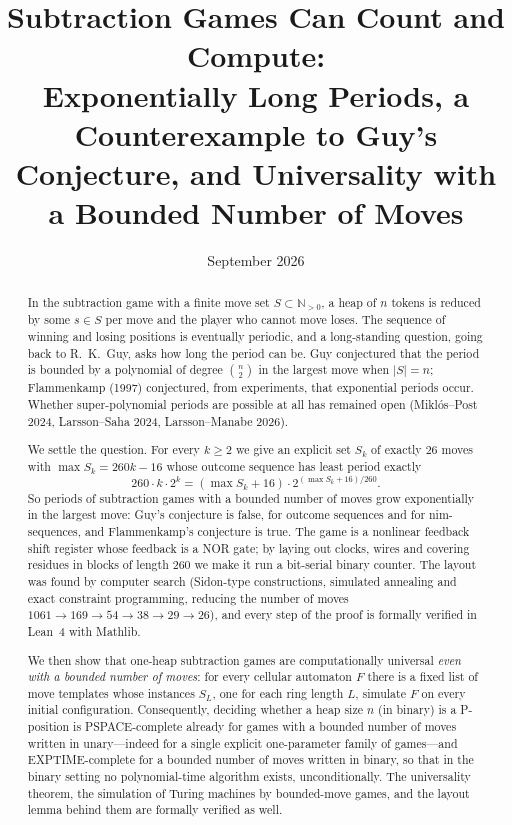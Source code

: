 \documentclass[11pt]{article}
\title{Subtraction Games Can Count and Compute:\\ Exponentially Long Periods, a Counterexample to Guy's
Conjecture, and Universality with a Bounded Number of Moves}
\author{}
\date{September 2026}
\theoremstyle{definition}
\newcommand{\N}{\mathbb{N}}
\newcommand{\nmoves}{26}
\begin{document}
\maketitle

\begin{abstract}
In the subtraction game with a finite move set $S\subset\N_{>0}$, a heap of $n$ tokens is reduced
by some $s\in S$ per move and the player who cannot move loses.  The sequence of winning and losing
positions is eventually periodic, and a long-standing question, going back to R.~K.~Guy, asks how
long the period can be.  Guy conjectured that the period is bounded by a polynomial of degree
$\binom{n}{2}$ in the largest move when $|S|=n$; Flammenkamp (1997) conjectured, from experiments,
that exponential periods occur.  Whether super-polynomial periods are possible at all has remained
open (Miklós--Post 2024, Larsson--Saha 2024, Larsson--Manabe 2026).

We settle the question.  For every $k\ge2$ we give an explicit set $S_k$ of exactly $\nmoves$ moves
with $\max S_k=260k-16$ whose outcome sequence has least period exactly
\[260\cdot k\cdot 2^k=(\max S_k+16)\cdot 2^{(\max S_k+16)/260}.\]
So periods of subtraction games with a bounded number of moves grow exponentially in the largest
move: Guy's conjecture is false, for outcome sequences and for nim-sequences, and Flammenkamp's
conjecture is true.  The game is a nonlinear feedback shift register whose feedback is a NOR gate;
by laying out clocks, wires and covering residues in blocks of length $260$ we make it run a
bit-serial binary counter.  The layout was found by computer search (Sidon-type constructions,
simulated annealing and exact constraint programming, reducing the number of moves
$1061\to169\to54\to38\to29\to\nmoves$), and every step of the proof is formally verified in Lean~4 with
Mathlib.

We then show that one-heap subtraction games are computationally universal \emph{even with a
bounded number of moves}: for every cellular automaton $F$ there is a fixed list of move templates
whose instances $S_L$, one for each ring length $L$, simulate $F$ on every initial configuration.
Consequently, deciding whether a heap size $n$ (in binary) is a P-position is PSPACE-complete already
for games with a bounded number of moves written in unary---indeed for a single explicit
one-parameter family of games---and EXPTIME-complete for a bounded number of moves written in binary,
so that in the binary setting no polynomial-time algorithm exists, unconditionally.  The universality
theorem, the simulation of Turing machines by bounded-move games, and the layout lemma behind them are
formally verified as well.
\end{abstract}
\end{document}
